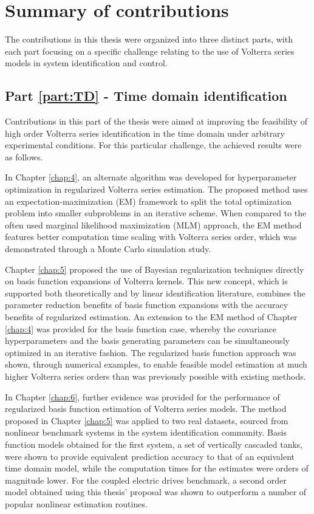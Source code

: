 \section{Summary of contributions}

The contributions in this thesis were organized into three distinct parts, with each part focusing on a specific challenge relating to the use of Volterra series models in system identification and control. 

\subsection{Part \ref{part:TD} - Time domain identification}

Contributions in this part of the thesis were aimed at improving the feasibility of high order Volterra series identification in the time domain under arbitrary experimental conditions. For this particular challenge, the achieved results were as follows.

In Chapter \ref{chap:4}, an alternate algorithm was developed for hyperparameter optimization in regularized Volterra series estimation. The proposed method uses an expectation-maximization (EM) framework to split the total optimization problem into smaller subproblems in an iterative scheme. When compared to the often used marginal likelihood maximization (MLM) approach, the EM method features better computation time scaling with Volterra series order, which was demonstrated through a Monte Carlo simulation study.

Chapter \ref{chap:5} proposed the use of Bayesian regularization techniques directly on basis function expansions of Volterra kernels. This new concept, which is supported both theoretically and by linear identification literature, combines the parameter reduction benefits of basis function expansions with the accuracy benefits of regularized estimation. An extension to the EM method of Chapter \ref{chap:4} was provided for the basis function case, whereby the covariance hyperparameters and the basis generating parameters can be simultaneously optimized in an iterative fashion. The regularized basis function approach was shown, through numerical examples, to enable feasible model estimation at much higher Volterra series orders than was previously possible with existing methods.

In Chapter \ref{chap:6}, further evidence was provided for the performance of regularized basis function estimation of Volterra series models. The method proposed in Chapter \ref{chap:5} was applied to two real datasets, sourced from nonlinear benchmark systems in the system identification community. Basis function models obtained for the first system, a set of vertically cascaded tanks, were shown to provide equivalent prediction accuracy to that of an equivalent time domain model, while the computation times for the estimates were orders of magnitude lower. For the coupled electric drives benchmark, a second order model obtained using this thesis' proposal was shown to outperform a number of popular nonlinear estimation routines. 

